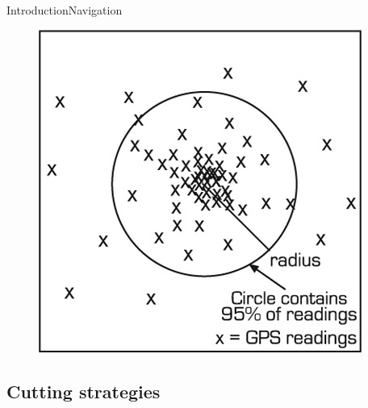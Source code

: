 \begin{frame}{Introduction}{Navigation}
    \begin{figure}[!htb]
    \centering
        \includegraphics[width=0.7\linewidth]{Pictures/gps.jpg}
    \end{figure}
\end{frame}


\subsection{Cutting strategies}

